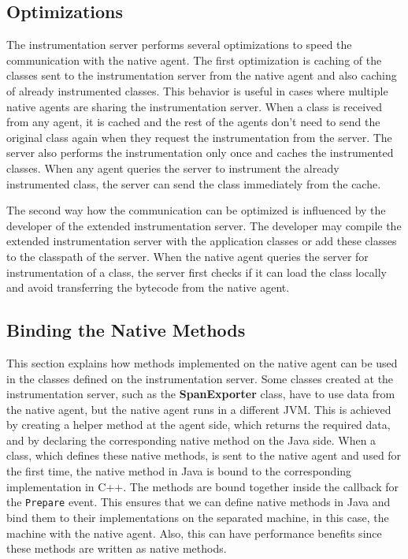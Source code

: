 \subsection{Optimizations}
The instrumentation server performs several optimizations to speed the communication with the native agent. The first optimization is caching of the classes sent to the instrumentation server from the native agent and also caching of already instrumented classes. This behavior is useful in cases where multiple native agents are sharing the instrumentation server. When a class is received from any agent, it is cached and the rest of the agents don't need to send the original class again when they request the instrumentation from the server. The server also performs the instrumentation only once and caches the instrumented classes. When any agent queries the server to instrument the already instrumented class, the server can send the class immediately from the cache.

The second way how the communication can be optimized is influenced by the developer of the extended instrumentation server. The developer may compile the extended instrumentation server with the application classes or add these classes to the classpath of the server. When the native agent queries the server for instrumentation of a class, the server first checks if it can load the class locally and avoid transferring the bytecode from the native agent. 

\subsection{Binding the Native Methods}
This section explains how methods implemented on the native agent can be used in the classes defined on the instrumentation server. Some classes created at the instrumentation server, such as the \textbf{SpanExporter} class, have to use data from the native agent, but the native agent runs in a different JVM. This is achieved by creating a helper method at the agent side, which returns the required data, and by declaring the corresponding native method on the Java side. When a class, which defines these native methods, is sent to the native agent and used for the first time, the native method in Java is bound to the corresponding implementation in C++. The methods are bound together inside the callback for the \texttt{Prepare} event. This ensures that we can define native methods in Java and bind them to their implementations on the separated machine, in this case, the machine with the native agent. Also, this can have performance benefits since these methods are written as native methods.

